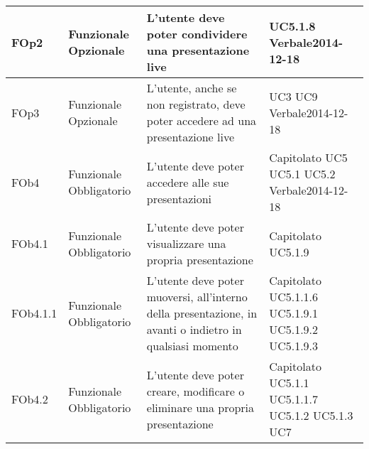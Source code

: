 \begin{longtable}{|l|p{2.5cm}|p{5cm}|p{3.5cm}|}
\hline
FOp2 & Funzionale \linebreak Opzionale & L'utente deve poter condividere una presentazione live & UC5.1.8 \linebreak Verbale2014-12-18 \linebreak \\
\hline
FOp3 & Funzionale \linebreak Opzionale & L'utente, anche se non registrato, deve poter accedere ad una presentazione live  & UC3 \linebreak UC9 \linebreak Verbale2014-12-18 \linebreak \\
\hline
FOb4 & Funzionale \linebreak Obbligatorio & L'utente deve poter accedere alle sue presentazioni & Capitolato \linebreak UC5 \linebreak UC5.1 \linebreak UC5.2 \linebreak Verbale2014-12-18 \linebreak \\
\hline
FOb4.1 & Funzionale \linebreak Obbligatorio & L'utente deve poter visualizzare una propria presentazione & Capitolato \linebreak  UC5.1.9 \linebreak  \\
\hline
FOb4.1.1 & Funzionale \linebreak Obbligatorio & L'utente deve poter muoversi, all'interno della presentazione, in avanti o indietro in qualsiasi momento & Capitolato \linebreak  UC5.1.1.6 \linebreak  UC5.1.9.1 \linebreak  UC5.1.9.2 \linebreak  UC5.1.9.3 \linebreak  \\
\hline
FOb4.2 & Funzionale \linebreak Obbligatorio & L'utente deve poter creare, modificare o eliminare una propria presentazione & Capitolato \linebreak  UC5.1.1 \linebreak  UC5.1.1.7 \linebreak  UC5.1.2 \linebreak  UC5.1.3 \linebreak  UC7 \linebreak  \\

\end{longtable}
